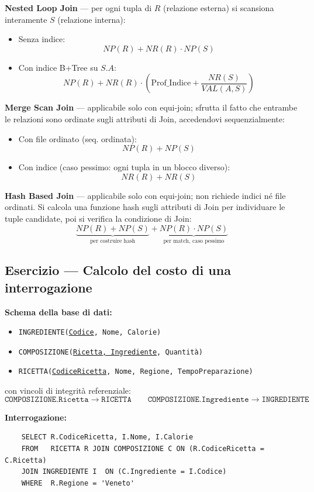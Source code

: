 \noindent\textbf{Nested Loop Join} — per ogni tupla di $R$ (relazione esterna) si scansiona interamente $S$ (relazione interna):
\begin{itemize}
	\item Senza indice:
	\[
	NP(R) + NR(R) \cdot NP(S)
	\]
	\item Con indice B+Tree su $S.A$:
	\[
	NP(R) + NR(R) \cdot \left(\text{Prof\_Indice} + \frac{NR(S)}{VAL(A,S)}\right)
	\]
\end{itemize}

\bigskip
\noindent\textbf{Merge Scan Join} — applicabile solo con equi-join; sfrutta il fatto che entrambe le relazioni sono ordinate sugli attributi di Join, accedendovi sequenzialmente:
\begin{itemize}
	\item Con file ordinato (seq. ordinata):
	\[
	NP(R) + NP(S)
	\]
	\item Con indice (caso pessimo: ogni tupla in un blocco diverso):
	\[
	NR(R) + NR(S)
	\]
\end{itemize}

\bigskip
\noindent\textbf{Hash Based Join} — applicabile solo con equi-join; non richiede indici né file ordinati. Si calcola una funzione hash sugli attributi di Join per individuare le tuple candidate, poi si verifica la condizione di Join:
\[
\underbrace{NP(R) + NP(S)}_{\text{per costruire hash}} + \underbrace{NP(R) \cdot NP(S)}_{\text{per match, caso pessimo}}
\]
\subsection*{Esercizio — Calcolo del costo di una interrogazione}

\noindent\textbf{Schema della base di dati:}
\begin{itemize}
	\item \texttt{INGREDIENTE(\underline{Codice}, Nome, Calorie)}
	\item \texttt{COMPOSIZIONE(\underline{Ricetta, Ingrediente}, Quantità)}
	\item \texttt{RICETTA(\underline{CodiceRicetta}, Nome, Regione, TempoPreparazione)}
\end{itemize}

\noindent con vincoli di integrità referenziale:
\[
\texttt{COMPOSIZIONE.Ricetta} \rightarrow \texttt{RICETTA}
\qquad
\texttt{COMPOSIZIONE.Ingrediente} \rightarrow \texttt{INGREDIENTE}
\]

\bigskip
\noindent\textbf{Interrogazione:}
\begin{verbatim}
	SELECT R.CodiceRicetta, I.Nome, I.Calorie
	FROM   RICETTA R JOIN COMPOSIZIONE C ON (R.CodiceRicetta = C.Ricetta)
	JOIN INGREDIENTE I  ON (C.Ingrediente = I.Codice)
	WHERE  R.Regione = 'Veneto'
\end{verbatim}

